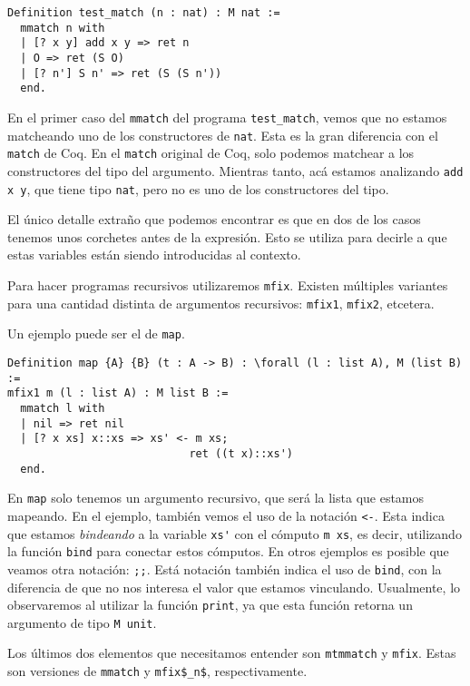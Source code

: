 \begin{lstlisting}
Definition test_match (n : nat) : M nat :=
  mmatch n with
  | [? x y] add x y => ret n
  | O => ret (S O)
  | [? n'] S n' => ret (S (S n'))
  end.
\end{lstlisting}

En el primer caso del \lstinline{mmatch} del programa \lstinline{test_match}, vemos que no estamos matcheando uno de los constructores de \lstinline{nat}.
Esta es la gran diferencia con el \lstinline{match} de Coq.
En el \lstinline{match} original de Coq, solo podemos matchear a los constructores del tipo del argumento.
Mientras tanto, acá estamos analizando \lstinline{add x y}, que tiene tipo \lstinline{nat}, pero no es uno de los constructores del tipo.

El único detalle extraño que podemos encontrar es que en dos de los casos tenemos unos corchetes antes de la expresión.
Esto se utiliza para decirle a \Mtac que estas variables están siendo introducidas al contexto.

Para hacer programas recursivos utilizaremos \lstinline{mfix}. Existen múltiples variantes para una cantidad distinta de argumentos recursivos: \lstinline{mfix1}, \lstinline{mfix2}, etcetera.

Un ejemplo puede ser el de \lstinline{map}.

\begin{lstlisting}
Definition map {A} {B} (t : A -> B) : \forall (l : list A), M (list B) :=
mfix1 m (l : list A) : M list B :=
  mmatch l with
  | nil => ret nil
  | [? x xs] x::xs => xs' <- m xs;
                            ret ((t x)::xs')
  end.
\end{lstlisting}

En \lstinline{map} solo tenemos un argumento recursivo, que será la lista que estamos mapeando.
En el ejemplo, también vemos el uso de la notación \lstinline{<-}.
Esta indica que estamos \emph{bindeando} a la variable \lstinline{xs'} con el cómputo \lstinline{m xs}, es decir, utilizando la función \lstinline{bind} para conectar estos cómputos.
En otros ejemplos es posible que veamos otra notación: \lstinline{;;}.
Está notación también indica el uso de \lstinline{bind}, con la diferencia de que no nos interesa el valor que estamos vinculando.
Usualmente, lo observaremos al utilizar la función \lstinline{print}, ya que esta función retorna un argumento de tipo \lstinline{M unit}.

Los últimos dos elementos que necesitamos entender son \lstinline{mtmmatch} y \lstinline{mfix}.
Estas son versiones de \lstinline{mmatch} y \lstinline{mfix$_n$}, respectivamente.


